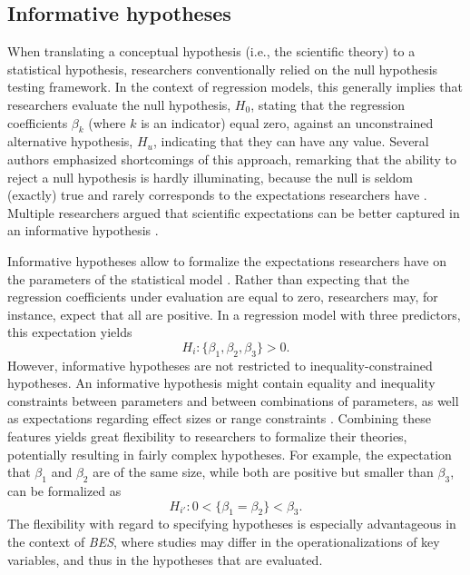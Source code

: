 \documentclass[review, 3p, authoryear]{elsarticle} %
\begin{document}
\hypertarget{informative-hypotheses}{%
\subsection{Informative hypotheses}\label{informative-hypotheses}}

When translating a conceptual hypothesis (i.e., the scientific theory) to a statistical hypothesis, researchers conventionally relied on the null hypothesis testing framework.
In the context of regression models, this generally implies that researchers evaluate the null hypothesis, \(H_0\), stating that the regression coefficients \(\beta_k\) (where \(k\) is an indicator) equal zero, against an unconstrained alternative hypothesis, \(H_u\), indicating that they can have any value.
Several authors emphasized shortcomings of this approach, remarking that the ability to reject a null hypothesis is hardly illuminating, because the null is seldom (exactly) true \citep{cohen_earth_1994, lykken_wrong_1991} and rarely corresponds to the expectations researchers have \citep{cohen_things_i_learned_1990, vandeschoot_informative_2011, royall1997statistical, trafimow_manipulating_2018}.
Multiple researchers argued that scientific expectations can be better captured in an informative hypothesis \citep{hoijtink_informative_2012, vandeschoot_informative_2011}.

Informative hypotheses allow to formalize the expectations researchers have on the parameters of the statistical model \citep{hoijtink_informative_2012}.
Rather than expecting that the regression coefficients under evaluation are equal to zero, researchers may, for instance, expect that all are positive.
In a regression model with three predictors, this expectation yields
\[
H_i: \{\beta_1, \beta_2, \beta_3\} > 0.
\]
However, informative hypotheses are not restricted to inequality-constrained hypotheses.
An informative hypothesis might contain equality and inequality constraints between parameters and between combinations of parameters, as well as expectations regarding effect sizes or range constraints \citep{hoijtink2019tutorial}.
Combining these features yields great flexibility to researchers to formalize their theories, potentially resulting in fairly complex hypotheses.
For example, the expectation that \(\beta_1\) and \(\beta_2\) are of the same size, while both are positive but smaller than \(\beta_3\), can be formalized as
\[
H_{i'}: 0 < \{\beta_1=\beta_2\} < \beta_3. 
\]
The flexibility with regard to specifying hypotheses is especially advantageous in the context of \emph{BES}, where studies may differ in the operationalizations of key variables, and thus in the hypotheses that are evaluated.
\end{document}
